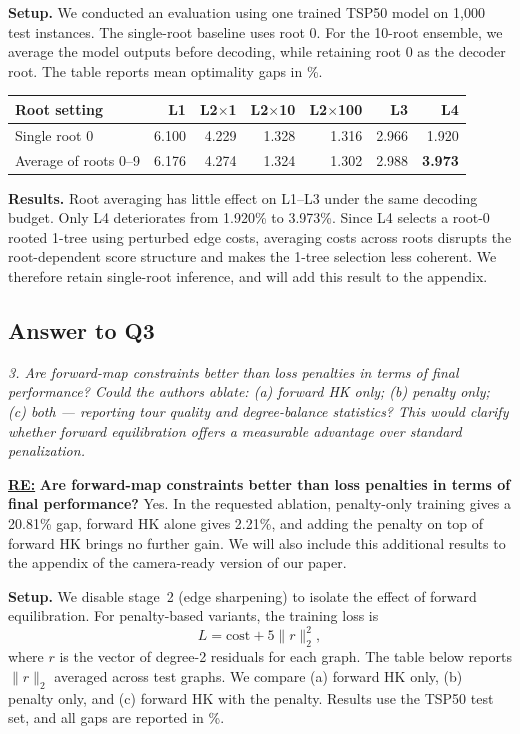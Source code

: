 \textbf{Setup.} We conducted an evaluation using one trained TSP50 model on 1,000 test instances. The single-root baseline uses root 0. For the 10-root ensemble, we average the model outputs before decoding, while retaining root 0 as the decoder root. The table reports mean optimality gaps in \%.

\begin{center}
\begin{tabular}{lrrrrrr}
\hline
Root setting & L1 & L2$\times$1 & L2$\times$10 & L2$\times$100 & L3 & L4 \\
\hline
Single root 0
& 6.100 & 4.229 & 1.328 & 1.316 & 2.966 & 1.920 \\
Average of roots 0--9
& 6.176 & 4.274 & 1.324 & 1.302 & 2.988 & \textbf{3.973} \\
\hline
\end{tabular}
\end{center}

\textbf{Results.} Root averaging has little effect on L1--L3 under the same decoding budget. Only L4 deteriorates from 1.920\% to 3.973\%. Since L4 selects a root-0 rooted 1-tree using perturbed edge costs, averaging costs across roots disrupts the root-dependent score structure and makes the 1-tree selection less coherent. We therefore retain single-root inference, and will add this result to the appendix.

\subsection{Answer to Q3}

\textit{3. Are forward-map constraints better than loss penalties in terms of final performance? Could the authors ablate: (a) forward HK only; (b) penalty only; (c) both — reporting tour quality and degree-balance statistics? This would clarify whether forward equilibration offers a measurable advantage over standard penalization.}

\textbf{\underline{RE:}}
\textbf{Are forward-map constraints better than loss penalties in terms of final performance?} Yes. In the requested ablation, penalty-only training gives a 20.81\% gap, forward HK alone gives 2.21\%, and adding the penalty on top of forward HK brings no further gain. We will also include this additional results to the appendix of the camera-ready version of our paper. 

\textbf{Setup.}
We disable stage~2 (edge sharpening) to isolate the effect of forward equilibration. For penalty-based variants, the training loss is
\[
L=\mathrm{cost}+5\lVert r\rVert_2^2,
\]
where \(r\) is the vector of degree-2 residuals for each graph. The table below reports \(\lVert r\rVert_2\) averaged across test graphs. We compare (a) forward HK only, (b) penalty only, and (c) forward HK with the penalty. Results use the TSP50 test set, and all gaps are reported in \%.

